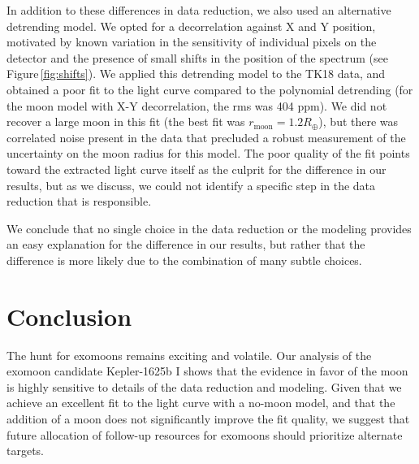 \documentclass[twocolumn]{aastex62}
\begin{document}
 
In addition to these differences in data reduction, we also used an alternative detrending model. We opted for a decorrelation against X and Y position, motivated by known variation in the sensitivity of individual pixels on the detector and the presence of small shifts in the position of the spectrum (see Figure\,\ref{fig:shifts}). We applied this detrending model to the TK18 data, and obtained a poor fit to the light curve compared to the polynomial detrending (for the moon model with X-Y decorrelation, the rms was 404 ppm). We did not recover a large moon in this fit (the best fit was $r_\mathrm{moon} = 1.2R_\oplus$), but there was correlated noise present in the data that precluded a robust measurement of the uncertainty on the moon radius for this model. The poor quality of the fit points toward the extracted light curve itself as the culprit for the difference in our results, but as we discuss, we could not identify a specific step in the data reduction that is responsible.

 We conclude that no single choice in the data reduction or the modeling provides an easy explanation for the difference in our results, but rather that the difference is more likely due to the combination of many subtle choices.

\section{Conclusion}
The hunt for exomoons remains exciting and volatile. Our analysis of the exomoon candidate Kepler-1625b I shows that the evidence in favor of the moon is highly sensitive to details of the data reduction and modeling. Given that we achieve an excellent fit to the light curve with a no-moon model, and that the addition of a moon does not significantly improve the fit quality, we suggest that future allocation of follow-up resources for exomoons should prioritize alternate targets.

\end{document}
